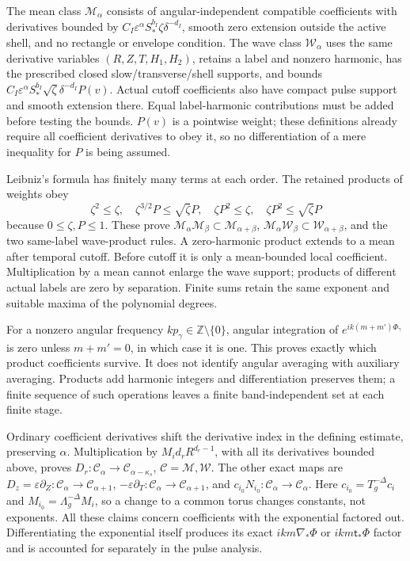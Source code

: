 \documentclass[10pt,a4paper]{article}
\begin{document}
The mean class \(\mathcal M_\alpha\) consists of angular-independent compatible coefficients with derivatives bounded by \(C_I\varepsilon^\alpha S_*^{b_I}\zeta\delta^{-d_I}\), smooth zero extension outside the active shell, and no rectangle or envelope condition. The wave class \(\mathcal W_\alpha\) uses the same derivative variables \((R,Z,T,H_1,H_2)\), retains a label and nonzero harmonic, has the prescribed closed slow/transverse/shell supports, and bounds \(C_I\varepsilon^\alpha S_*^{b_I}\sqrt\zeta\delta^{-d_I}P(v)\). Actual cutoff coefficients also have compact pulse support and smooth extension there. Equal label-harmonic contributions must be added before testing the bounds. \(P(v)\) is a pointwise weight; these definitions already require all coefficient derivatives to obey it, so no differentiation of a mere inequality for \(P\) is being assumed.

Leibniz's formula has finitely many terms at each order. The retained products of weights obey \[
\zeta^2\le\zeta,\quad\zeta^{3/2}P\le\sqrt\zeta P,
\quad\zeta P^2\le\zeta,\quad\zeta P^2\le\sqrt\zeta P
\] because \(0\le\zeta,P\le1\). These prove \(\mathcal M_\alpha\mathcal M_\beta\subset\mathcal M_{\alpha+\beta}\), \(\mathcal M_\alpha\mathcal W_\beta\subset\mathcal W_{\alpha+\beta}\), and the two same-label wave-product rules. A zero-harmonic product extends to a mean after temporal cutoff. Before cutoff it is only a mean-bounded local coefficient. Multiplication by a mean cannot enlarge the wave support; products of different actual labels are zero by separation. Finite sums retain the same exponent and suitable maxima of the polynomial degrees.

For a nonzero angular frequency \(kp_\gamma\in\mathbb Z\setminus\{0\}\), angular integration of \(e^{ik(m+m')\Phi_\gamma}\) is zero unless \(m+m'=0\), in which case it is one. This proves exactly which product coefficients survive. It does not identify angular averaging with auxiliary averaging. Products add harmonic integers and differentiation preserves them; a finite sequence of such operations leaves a finite band-independent set at each finite stage.

Ordinary coefficient derivatives shift the derivative index in the defining estimate, preserving \(\alpha\). Multiplication by \(M_id_rR^{d_r-1}\), with all its derivatives bounded above, proves \(D_r:\mathcal C_\alpha\to\mathcal C_{\alpha-\kappa_s}\), \(\mathcal C=\mathcal M,\mathcal W\). The other exact maps are \(D_z=\varepsilon\partial_Z:\mathcal C_\alpha\to\mathcal C_{\alpha+1}\), \(-\varepsilon\partial_T:\mathcal C_\alpha\to\mathcal C_{\alpha+1}\), and \(c_{i_0}N_{i_0}:\mathcal C_\alpha\to\mathcal C_\alpha\). Here \(c_{i_0}=T_g^{-\Delta}c_i\) and \(M_{i_0}=\Lambda_g^{-\Delta}M_i\), so a change to a common torus changes constants, not exponents. All these claims concern coefficients with the exponential factored out. Differentiating the exponential itself produces its exact \(ikm\nabla_*\Phi\) or \(ikm\mathsf t_*\Phi\) factor and is accounted for separately in the pulse analysis.
\end{document}
